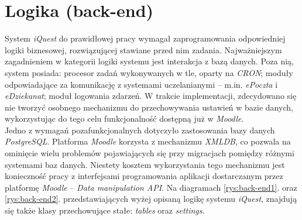 \section{Logika (back-end)}
\label{Chapter66}

System \textit{iQuest} do prawidłowej pracy wymagał zaprogramowania odpowiedniej logiki biznesowej, rozwiązującej stawiane przed nim zadania. Najważniejszym zagadnieniem w kategorii logiki systemu jest interakcja z bazą danych. Poza nią, system posiada: procesor zadań wykonywanych w tle, oparty na \textit{CRON}; moduły odpowiadające za komunikację z systemami uczelanianymi -- m.in. \textit{ePoczta} i \textit{eDziekanat}; moduł logowania zdarzeń. W trakcie implementacji, zdecydowano się nie tworzyć osobnego mechanizmu do przechowywania ustawień w bazie danych, wykorzystując do tego celu funkcjonalność dostępną już w \textit{Moodle}. \\

Jedno z wymagań pozafunkcjonalnych dotyczyło zastosowania bazy danych \textit{PostgreSQL}. Platforma \textit{Moodle} korzysta z mechanizmu \emph{XMLDB}, co pozwala na ominięcie wielu problemów pojawiających się przy migracjach pomiędzy różnymi systemami baz danych. Niestety kosztem wykorzystania tego mechanizmu jest konieczność pracy z interfejsami programowania aplikacji dostarczanym przez platformę \textit{Moodle} -- \textit{Data manipulation API}. Na diagramach \ref{rys:back-end1}. oraz \ref{rys:back-end2}. przedstawiających wyżej opisaną logikę systemu \textit{iQuest}, znajdują się także klasy przechowujące stałe: \textit{tables} oraz \textit{settings}. \\

